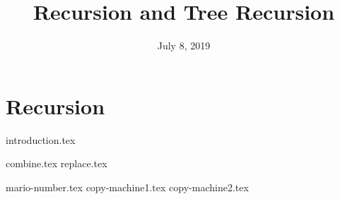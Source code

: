 \documentclass{exam}
\title{Recursion and Tree Recursion}
\date{July 8, 2019}
\begin{document}
\maketitle

\section{Recursion}
{introduction.tex}
\begin{questions}
{combine.tex}
\newpage
{replace.tex}

\newpage
{mario-number.tex}
{copy-machine1.tex}
\newpage
{copy-machine2.tex}
\end{questions}
\end{document}
